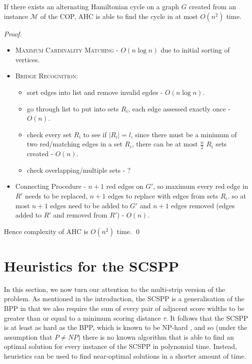 \documentclass[runningheads]{llncs}
\begin{document}
\begin{theorem}
	\label{thm:copsoln}
	If there exists an alternating Hamiltonian cycle on a graph $G$ created from an instance $\mathcal{M}$ of the COP, AHC is able to find the cycle in at most $O(n^2)$ time.
\end{theorem}
\begin{proof}
	\begin{itemize}
		\item \textsc{Maximum Cardinality Matching} - $O(n\log n)$ due to initial sorting of vertices.
		\item \textsc{Bridge Recognition}:
		\begin{itemize}
			\item sort edges into list and remove invalid egdes - $O(n \log n)$.
			\item go through list to put into sets $R_i$, each edge assessed exactly once - $O(n)$.
			\item check every set $R_i$ to see if $|R_i| = l$, since there must be a minimum of two red/matching edges in a set $R_i$, there can be at most $\frac{n}{2}$ $R_i$ sets created - $O(n)$.
			\item check overlapping/multiple sets - ?
		\end{itemize}	
		\item Connecting Procedure - $n+1$ red edges on $G'$, so maximum every red edge in $R'$ needs to be replaced, $n+1$ edges to replace with edges from sets $R_i$. so at most $n+1$ edges need to be added to $G'$ and $n+1$ edges removed (edges added to $R'$ and removed from $R'$) - $O(n)$.
	\end{itemize}
	Hence complexity of AHC is $O(n^2)$ time.
	\qed
\end{proof}


\section{Heuristics for the SCSPP}
\label{sec:scsppsoln}

In this section, we now turn our attention to the multi-strip version of the problem. As mentioned in the introduction, the SCSPP is a generalisation of the BPP in that we also require the sum of every pair of adjacent score widths to be greater than or equal to a minimum scoring distance $\tau$. It follows that the SCSPP is at least as hard as the BPP, which is known to be NP-hard \cite{garey1979}, and so (under the assumption that $P \neq NP$) there is no known algorithm that is able to find an optimal solution for every instance of the SCSPP in polynomial time. Instead, heuristics can be used to find near-optimal solutions in a shorter amount of time.
\end{document}
